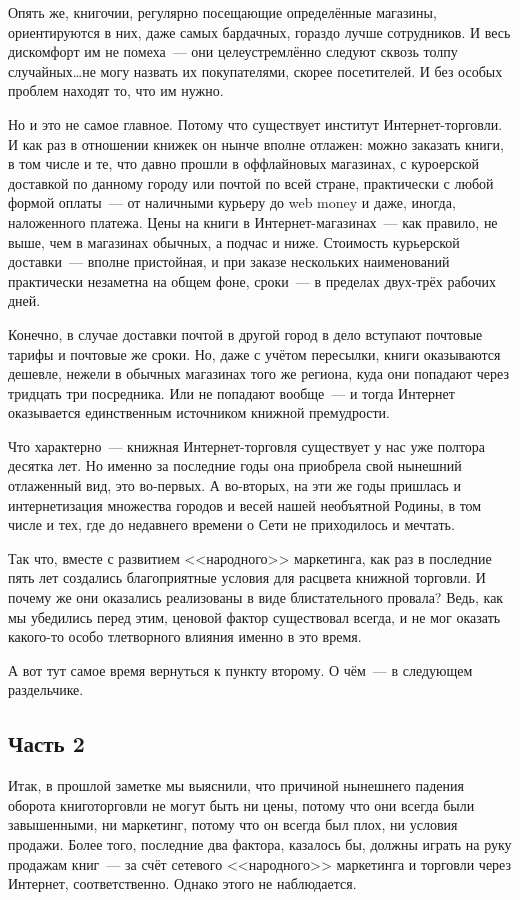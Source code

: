 Опять же, книгочии, регулярно посещающие определённые магазины, ориентируются в них, даже самых бардачных, гораздо лучше сотрудников. И весь дискомфорт им не помеха~--- они целеустремлённо следуют сквозь толпу случайных\dots не могу назвать их покупателями, скорее посетителей. И без особых проблем находят то, что им нужно.

Но и это не самое главное. Потому что существует институт Интернет-торговли. И как раз в отношении книжек он нынче вполне отлажен: можно заказать книги, в том числе и те, что давно прошли в оффлайновых магазинах, с куроерской доставкой по данному городу или почтой по всей стране, практически с любой формой оплаты~--- от наличными курьеру до web money и даже, иногда, наложенного платежа. Цены на книги в Интернет-магазинах~--- как правило, не выше, чем в магазинах обычных, а подчас и ниже. Стоимость курьерской доставки~--- вполне пристойная, и при заказе нескольких наименований практически незаметна на общем фоне, сроки~--- в пределах двух-трёх рабочих дней.

Конечно, в случае доставки почтой в другой город в дело вступают почтовые тарифы и почтовые же сроки. Но, даже с учётом пересылки, книги оказываются дешевле, нежели в обычных магазинах того же региона, куда они попадают через тридцать три посредника. Или не попадают вообще~--- и тогда Интернет оказывается единственным источником книжной премудрости.

Что характерно~--- книжная Интернет-торговля существует у нас уже полтора десятка лет. Но именно за последние годы она приобрела свой нынешний отлаженный вид, это во-первых. А во-вторых, на эти же годы пришлась и интернетизация множества городов и весей нашей необъятной Родины, в том числе и тех, где до недавнего времени о Сети не приходилось и мечтать.

Так что, вместе с развитием <<народного>> маркетинга, как раз в последние пять лет создались благоприятные условия для расцвета книжной торговли. И почему же они оказались реализованы в виде блистательного провала? Ведь, как мы убедились перед этим, ценовой фактор существовал всегда, и не мог оказать какого-то особо тлетворного влияния именно в это время.

А вот тут самое время вернуться к пункту второму.  О чём~--- в следующем раздельчике.

\subsection{Часть 2}
Итак, в прошлой заметке мы выяснили, что причиной нынешнего падения оборота книготорговли не могут быть ни цены, потому что они всегда были завышенными, ни маркетинг, потому что он всегда был плох, ни условия продажи. Более того, последние два фактора, казалось бы, должны играть на руку продажам книг~--- за счёт сетевого <<народного>> маркетинга и торговли через Интернет, соответственно. Однако этого не наблюдается.

